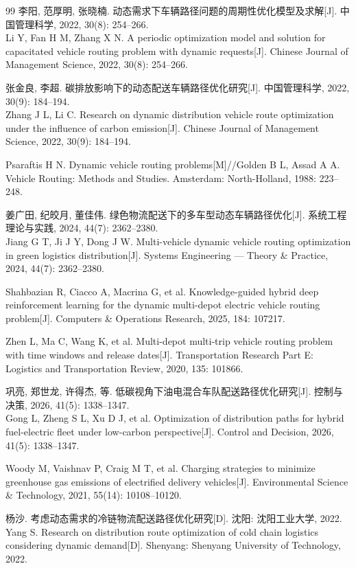 \documentclass{setp-new}
\begin{document}
\begin{thebibliography}{99}
 李阳, 范厚明, 张晓楠. 动态需求下车辆路径问题的周期性优化模型及求解[J]. 中国管理科学, 2022, 30(8): 254--266.\\
Li Y, Fan H M, Zhang X N. A periodic optimization model and solution for capacitated vehicle routing problem with dynamic requests[J]. Chinese Journal of Management Science, 2022, 30(8): 254--266.

 张金良, 李超. 碳排放影响下的动态配送车辆路径优化研究[J]. 中国管理科学, 2022, 30(9): 184--194.\\
Zhang J L, Li C. Research on dynamic distribution vehicle route optimization under the influence of carbon emission[J]. Chinese Journal of Management Science, 2022, 30(9): 184--194.

 Psaraftis H N. Dynamic vehicle routing problems[M]//Golden B L, Assad A A. Vehicle Routing: Methods and Studies. Amsterdam: North-Holland, 1988: 223--248.

 姜广田, 纪皎月, 董佳伟. 绿色物流配送下的多车型动态车辆路径优化[J]. 系统工程理论与实践, 2024, 44(7): 2362--2380.\\
Jiang G T, Ji J Y, Dong J W. Multi-vehicle dynamic vehicle routing optimization in green logistics distribution[J]. Systems Engineering --- Theory \& Practice, 2024, 44(7): 2362--2380.

 Shahbazian R, Ciacco A, Macrina G, et al. Knowledge-guided hybrid deep reinforcement learning for the dynamic multi-depot electric vehicle routing problem[J]. Computers \& Operations Research, 2025, 184: 107217.

 Zhen L, Ma C, Wang K, et al. Multi-depot multi-trip vehicle routing problem with time windows and release dates[J]. Transportation Research Part E: Logistics and Transportation Review, 2020, 135: 101866.

 巩亮, 郑世龙, 许得杰, 等. 低碳视角下油电混合车队配送路径优化研究[J]. 控制与决策, 2026, 41(5): 1338--1347.\\
Gong L, Zheng S L, Xu D J, et al. Optimization of distribution paths for hybrid fuel-electric fleet under low-carbon perspective[J]. Control and Decision, 2026, 41(5): 1338--1347.

 Woody M, Vaishnav P, Craig M T, et al. Charging strategies to minimize greenhouse gas emissions of electrified delivery vehicles[J]. Environmental Science \& Technology, 2021, 55(14): 10108--10120.

 杨沙. 考虑动态需求的冷链物流配送路径优化研究[D]. 沈阳: 沈阳工业大学, 2022.\\
Yang S. Research on distribution route optimization of cold chain logistics considering dynamic demand[D]. Shenyang: Shenyang University of Technology, 2022.


\end{thebibliography}
\end{document}

